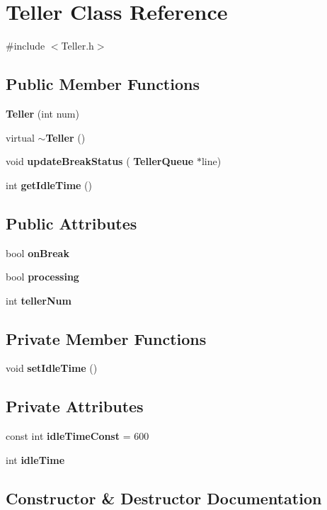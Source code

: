 \section{Teller Class Reference}
\label{classTeller}


{\ttfamily \#include $<$Teller.\+h$>$}

\subsection*{Public Member Functions}
\begin{DoxyCompactItemize}
\item 
\textbf{ Teller} (int num)
\item 
virtual \textbf{ $\sim$\+Teller} ()
\item 
void \textbf{ update\+Break\+Status} (\textbf{ Teller\+Queue} $\ast$line)
\item 
int \textbf{ get\+Idle\+Time} ()
\end{DoxyCompactItemize}
\subsection*{Public Attributes}
\begin{DoxyCompactItemize}
\item 
bool \textbf{ on\+Break}
\item 
bool \textbf{ processing}
\item 
int \textbf{ teller\+Num}
\end{DoxyCompactItemize}
\subsection*{Private Member Functions}
\begin{DoxyCompactItemize}
\item 
void \textbf{ set\+Idle\+Time} ()
\end{DoxyCompactItemize}
\subsection*{Private Attributes}
\begin{DoxyCompactItemize}
\item 
const int \textbf{ idle\+Time\+Const} = 600
\item 
int \textbf{ idle\+Time}
\end{DoxyCompactItemize}


\subsection{Constructor \& Destructor Documentation}
\mbox{\label{classTeller_a2ccfea7e98471237ffdc68687cf38970}} 
